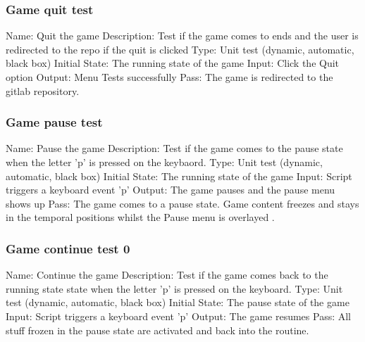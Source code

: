 \documentclass{article}
\begin{document}
\subsubsection{Game quit test}
Name:  Quit the game\newline
Description: Test if the game comes to ends and the user is redirected to
 the repo if the quit is clicked \newline
Type: Unit test (dynamic, automatic, black box) \newline
Initial State:  The running state of the game \newline
Input: Click the Quit option\newline
Output: Menu Tests successfully \newline
Pass: The game is redirected to the gitlab repository.  \newline

\subsubsection{Game pause test}
Name:  Pause the game\newline
Description: Test if the game comes to the pause state when the letter 'p' is 
pressed on the keybaord. \newline
Type: Unit test (dynamic, automatic, black box) \newline
Initial State: The running state of the game \newline
Input: Script triggers a keyboard event 'p'\newline
Output: The game pauses and the pause menu shows up \newline
Pass: The game comes to a pause state. Game content freezes and 
stays in the temporal positions whilst the Pause menu is overlayed . \newline

\subsubsection{Game continue test 0}
Name:  Continue the game\newline
Description: Test if the game comes back to the running state state when the letter 'p' is 
pressed on the keyboard. \newline
Type: Unit test (dynamic, automatic, black box) \newline
Initial State: The pause state of the game\newline
Input: Script triggers a keyboard event 'p'\newline
Output: The game resumes \newline
Pass: All stuff frozen in the pause state are activated and back into the 
routine. \newline
\end{document}
